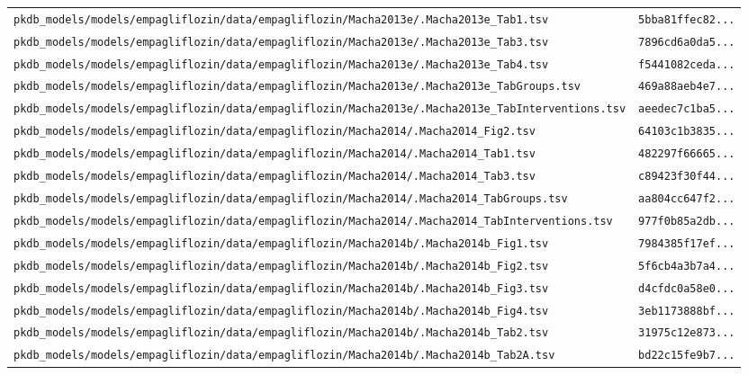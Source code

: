 \documentclass{article}
\begin{document}
\begin{longtable}{ll}
\texttt{pkdb\_models/models/empagliflozin/data/empagliflozin/Macha2013e/.Macha2013e\_Tab1.tsv} & \texttt{5bba81ffec82...} \\
\texttt{pkdb\_models/models/empagliflozin/data/empagliflozin/Macha2013e/.Macha2013e\_Tab3.tsv} & \texttt{7896cd6a0da5...} \\
\texttt{pkdb\_models/models/empagliflozin/data/empagliflozin/Macha2013e/.Macha2013e\_Tab4.tsv} & \texttt{f5441082ceda...} \\
\texttt{pkdb\_models/models/empagliflozin/data/empagliflozin/Macha2013e/.Macha2013e\_TabGroups.tsv} & \texttt{469a88aeb4e7...} \\
\texttt{pkdb\_models/models/empagliflozin/data/empagliflozin/Macha2013e/.Macha2013e\_TabInterventions.tsv} & \texttt{aeedec7c1ba5...} \\
\texttt{pkdb\_models/models/empagliflozin/data/empagliflozin/Macha2014/.Macha2014\_Fig2.tsv} & \texttt{64103c1b3835...} \\
\texttt{pkdb\_models/models/empagliflozin/data/empagliflozin/Macha2014/.Macha2014\_Tab1.tsv} & \texttt{482297f66665...} \\
\texttt{pkdb\_models/models/empagliflozin/data/empagliflozin/Macha2014/.Macha2014\_Tab3.tsv} & \texttt{c89423f30f44...} \\
\texttt{pkdb\_models/models/empagliflozin/data/empagliflozin/Macha2014/.Macha2014\_TabGroups.tsv} & \texttt{aa804cc647f2...} \\
\texttt{pkdb\_models/models/empagliflozin/data/empagliflozin/Macha2014/.Macha2014\_TabInterventions.tsv} & \texttt{977f0b85a2db...} \\
\texttt{pkdb\_models/models/empagliflozin/data/empagliflozin/Macha2014b/.Macha2014b\_Fig1.tsv} & \texttt{7984385f17ef...} \\
\texttt{pkdb\_models/models/empagliflozin/data/empagliflozin/Macha2014b/.Macha2014b\_Fig2.tsv} & \texttt{5f6cb4a3b7a4...} \\
\texttt{pkdb\_models/models/empagliflozin/data/empagliflozin/Macha2014b/.Macha2014b\_Fig3.tsv} & \texttt{d4cfdc0a58e0...} \\
\texttt{pkdb\_models/models/empagliflozin/data/empagliflozin/Macha2014b/.Macha2014b\_Fig4.tsv} & \texttt{3eb1173888bf...} \\
\texttt{pkdb\_models/models/empagliflozin/data/empagliflozin/Macha2014b/.Macha2014b\_Tab2.tsv} & \texttt{31975c12e873...} \\
\texttt{pkdb\_models/models/empagliflozin/data/empagliflozin/Macha2014b/.Macha2014b\_Tab2A.tsv} & \texttt{bd22c15fe9b7...} \\

\end{longtable}
\end{document}
